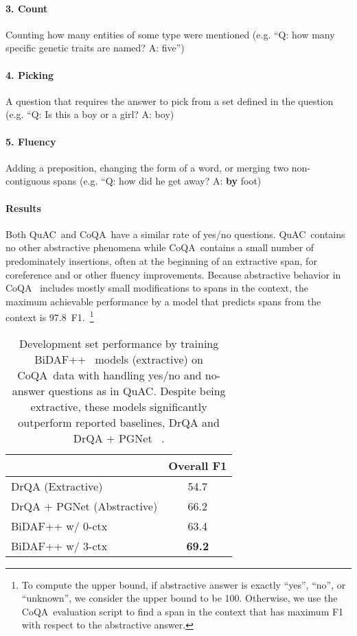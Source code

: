 \documentclass[11pt,a4paper]{article}
\newcommand{\quact}[0]{QuAC}
\newcommand{\coqa}[0]{CoQA}
\begin{document}
\paragraph{3. Count} Counting how many entities of some type were mentioned (e.g. ``Q: how many specific genetic traits are named? A: five'')
\vspace{-7pt}
\paragraph{4. Picking} A question that requires the answer to pick from a set defined in the question (e.g. ``Q: Is this a boy or a girl? A: boy)
\vspace{-7pt}
\paragraph{5. Fluency} Adding a preposition, changing the form of a word, or merging two non-contiguous spans (e.g. ``Q: how did he get away? A: {\bf by} foot) 


\paragraph{Results} Both \quact~and \coqa~have a similar rate of yes/no questions. \quact~contains no other abstractive phenomena while \coqa~contains a small number of predominately insertions, often at the beginning of an extractive span, for coreference and or other fluency improvements. 
Because abstractive behavior in \coqa~ includes mostly small modifications to spans in the context, the maximum achievable performance by a model that predicts spans from the context is 97.8~F1.~\footnote{To compute the upper bound, if abstractive answer is exactly ``yes'', ``no'', or ``unknown'', we consider the upper bound to be 100. Otherwise, we use the \coqa~evaluation script to find a span in the context that has maximum F1 with respect to the abstractive answer. }



\begin{table}[t]
\begin{center}
 \small

\begin{tabular}{l|c}
 & Overall F1
\\ \midrule
DrQA (Extractive) &  54.7 \\
DrQA + PGNet (Abstractive) &  66.2  \\
\midrule
BiDAF++ w/ 0-ctx  &   63.4 \\
BiDAF++ w/ 3-ctx  &  {\bf 69.2} \\
\end{tabular}
\vspace{-7pt}
\caption{Development set performance by training BiDAF++~\cite{ChoiQuAC2018} models (extractive) on \coqa~data with handling yes/no and no-answer questions as in \quact. Despite being extractive, these models significantly outperform reported baselines, DrQA and DrQA + PGNet ~\cite{Reddy18}.}
\vspace{-7pt}
\label{tab:extractivecoqa}
\end{center}
\end{table}
\end{document}
